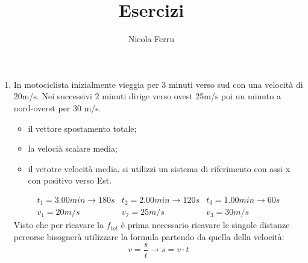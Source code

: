 \documentclass{article}
\title{Esercizi}
\author{Nicola Ferru}
\begin{document}
\maketitle
\begin{enumerate}
\item In motociclista inizialmente vieggia per 3 minuti verso sud con una velocità di 20m/s. Nei successivi 2 minuti dirige verso ovest 25m/s poi un minuto a nord-overst per 30 m/s.
  \begin{itemize}
  \item il vettore spostamento totale;
  \item la velocià scalare media;
  \item il vetotre velocità media. si utilizzi un sistema di riferimento con assi x con positivo verso Est.
  \end{itemize}
  \begin{eqnarray}
    \label{eq:esercizio1}
    t_1=3.00min \to 180s & t_2=2.00min \to 120s & t_3=1.00min \to 60s\\
    v_1= 20m/s & v_2=25m/s & v_3=30m/s
  \end{eqnarray}
  Visto che per ricavare la $f_{tot}$ è prima necessario ricavare le singole distanze percorse bisognerà utilizzare la formula partendo da quella della velocità:
  \begin{equation*}
    v=\frac{s}{t}\to s=v\cdot t
  \end{equation*}
  

\end{enumerate}
\end{document}
